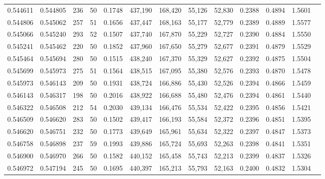 \begin{tabular}{rrrrrrrrrrrrr}
0.544611 & 0.544805 &   236 &  50 &                                     0.1748 & 437,190 & 168,420 &  55,126 &  52,830 & 0.2388 & 0.4894 & 1.5601 \\
0.544806 & 0.545062 &   257 &  51 &                                     0.1656 & 437,447 & 168,163 &  55,177 &  52,779 & 0.2389 & 0.4889 & 1.5577 \\
0.545066 & 0.545240 &   293 &  52 &                                     0.1507 & 437,740 & 167,870 &  55,229 &  52,727 & 0.2390 & 0.4884 & 1.5550 \\
0.545241 & 0.545462 &   220 &  50 &                                     0.1852 & 437,960 & 167,650 &  55,279 &  52,677 & 0.2391 & 0.4879 & 1.5529 \\
0.545464 & 0.545694 &   280 &  50 &                                     0.1515 & 438,240 & 167,370 &  55,329 &  52,627 & 0.2392 & 0.4875 & 1.5504 \\
0.545699 & 0.545973 &   275 &  51 &                                     0.1564 & 438,515 & 167,095 &  55,380 &  52,576 & 0.2393 & 0.4870 & 1.5478 \\
0.545973 & 0.546143 &   209 &  50 &                                     0.1931 & 438,724 & 166,886 &  55,430 &  52,526 & 0.2394 & 0.4866 & 1.5459 \\
0.546143 & 0.546317 &   198 &  50 &                                     0.2016 & 438,922 & 166,688 &  55,480 &  52,476 & 0.2394 & 0.4861 & 1.5440 \\
0.546322 & 0.546508 &   212 &  54 &                                     0.2030 & 439,134 & 166,476 &  55,534 &  52,422 & 0.2395 & 0.4856 & 1.5421 \\
0.546509 & 0.546620 &   283 &  50 &                                     0.1502 & 439,417 & 166,193 &  55,584 &  52,372 & 0.2396 & 0.4851 & 1.5395 \\
0.546620 & 0.546751 &   232 &  50 &                                     0.1773 & 439,649 & 165,961 &  55,634 &  52,322 & 0.2397 & 0.4847 & 1.5373 \\
0.546758 & 0.546898 &   237 &  59 &                                     0.1993 & 439,886 & 165,724 &  55,693 &  52,263 & 0.2398 & 0.4841 & 1.5351 \\
0.546900 & 0.546970 &   266 &  50 &                                     0.1582 & 440,152 & 165,458 &  55,743 &  52,213 & 0.2399 & 0.4837 & 1.5326 \\
0.546972 & 0.547194 &   245 &  50 &                                     0.1695 & 440,397 & 165,213 &  55,793 &  52,163 & 0.2400 & 0.4832 & 1.5304 \\

\end{tabular}
